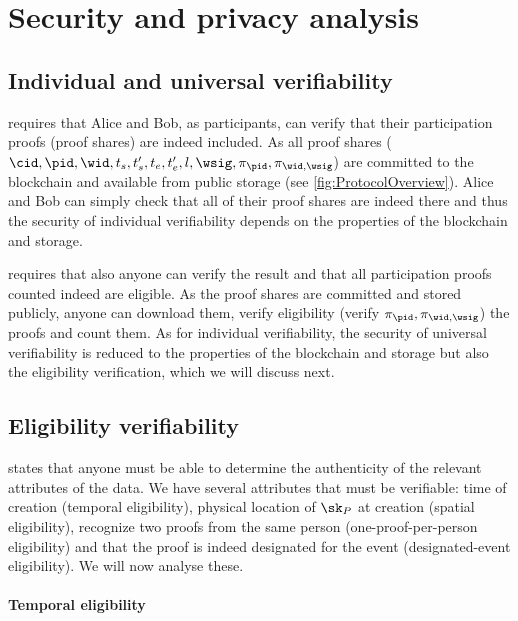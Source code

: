 \section{Security and privacy analysis}%
\label{SecurityAnalysis}

\subsection{Individual and universal verifiability}%
\label{analysis-individual}%
\label{analysis-universal}

 requires that Alice and Bob, as participants, can verify 
that their participation proofs (proof shares) are indeed included.
As all proof shares (\ie \(\cid, \pid, \wid, t_s, t_s', t_e, t_e', l, \wsig, 
  \pi_\pid, \pi_{\wid, \wsig}\)) are committed to the blockchain and available 
from public storage (see \cref{fig:ProtocolOverview}).
Alice and Bob can simply check that all of their proof shares are indeed there 
and thus the security of individual verifiability depends on the properties of 
the blockchain and storage.

 requires that also anyone can verify the result and that 
all participation proofs counted indeed are eligible.
As the proof shares are committed and stored publicly, anyone can download them, 
verify eligibility (\ie verify \(\pi_\pid, \pi_{\wid, \wsig}\)) the proofs and 
count them.
As for individual verifiability, the security of universal verifiability is 
reduced to the properties of the blockchain and storage but also the eligibility 
verification, which we will discuss next.

\subsection{Eligibility verifiability}%
\label{analysis-eligibility}

 states that anyone must be able to determine the 
authenticity of the relevant attributes of the data.
We have several attributes that must be verifiable:
time of creation (temporal eligibility),
physical location of \(\sk_P\) at creation (spatial eligibility),
recognize two proofs from the same person (one-proof-per-person eligibility) and 
that the proof is indeed designated for the event (designated-event 
eligibility).
We will now analyse these.

\paragraph{Temporal eligibility}%
\label{analysis-temporal}


